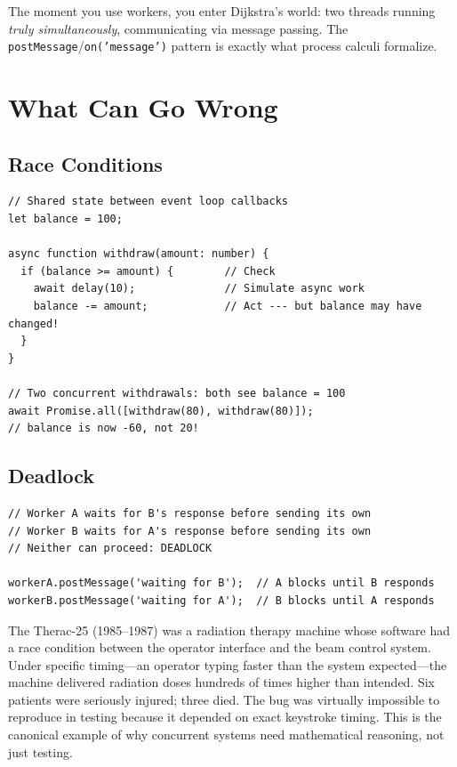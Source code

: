 \documentclass[11pt, a4paper, oneside]{book}
\newcommand{\lc}[1]{\texttt{#1}}
\begin{document}
The moment you use workers, you enter Dijkstra's world: two threads running
\emph{truly simultaneously}, communicating via message passing. The
\lc{postMessage}/\lc{on('message')} pattern is exactly what process calculi
formalize.

\section{What Can Go Wrong}

\subsection{Race Conditions}

\begin{tsbox}
\begin{verbatim}
// Shared state between event loop callbacks
let balance = 100;

async function withdraw(amount: number) {
  if (balance >= amount) {        // Check
    await delay(10);              // Simulate async work
    balance -= amount;            // Act --- but balance may have changed!
  }
}

// Two concurrent withdrawals: both see balance = 100
await Promise.all([withdraw(80), withdraw(80)]);
// balance is now -60, not 20!
\end{verbatim}
\end{tsbox}

\subsection{Deadlock}

\begin{tsbox}
\begin{verbatim}
// Worker A waits for B's response before sending its own
// Worker B waits for A's response before sending its own
// Neither can proceed: DEADLOCK

workerA.postMessage('waiting for B');  // A blocks until B responds
workerB.postMessage('waiting for A');  // B blocks until A responds
\end{verbatim}
\end{tsbox}

\begin{historical}[title={The Therac-25}]
The Therac-25 (1985--1987) was a radiation therapy machine whose software
had a race condition between the operator interface and the beam control
system. Under specific timing---an operator typing faster than the system
expected---the machine delivered radiation doses hundreds of times higher
than intended. Six patients were seriously injured; three died. The bug was
virtually impossible to reproduce in testing because it depended on exact
keystroke timing. This is the canonical example of why concurrent systems
need mathematical reasoning, not just testing.
\end{historical}
\end{document}
